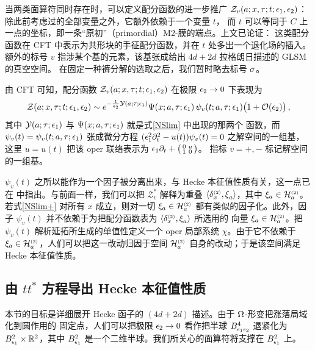 当两类面算符同时存在时，可以定义配分函数的进一步推广
$\mathcal{Z}_v(a;x,\tau;t;\epsilon_1,\epsilon_2)$：除此前考虑过的全部变量之外，它额外依赖于一个变量 $t$，
而 $t$ 可以等同于 $C$ 上一点的坐标，即一条“原初”（primordial）M2-膜的端点。上文已论证：
这类配分函数在 CFT 中表示为共形块的手征配分函数，并在 $t$ 处多出一个退化场的插入。
额外的标号 $v$ 指涉某个基的元素，该基张成给出 $4d+2d$ 拉格朗日描述的 GLSM 的真空空间。
在固定一种裤分解的选取之后，我们暂时略去标号 $\sigma$。

由 CFT \cite{T10,FGT} 可知，配分函数 $\mathcal{Z}_v(a;x,\tau;t;\epsilon_1,\epsilon_2)$ 在极限 $\epsilon_2\to 0$ 下表现为
\begin{equation}\label{NSlim+}
\mathcal{Z}(a;x,\tau;t;\epsilon_1,\epsilon_2)\sim
e^{-\frac{1}{\epsilon_2}\mathcal{Y}(a;\tau;\epsilon_1)}
\Psi(x;a,\tau;\epsilon_1)\,\psi_v(t;a,\tau;\epsilon_1)\big(1+\mathcal{O}(\epsilon_2)\big)\,,
\end{equation}
其中 $\mathcal{Y}(a;\tau;\epsilon_1)$ 与 $\Psi(x;a,\tau;\epsilon_1)$ 就是式\eqref{NSlim} 中出现的那两个
函数，而 $\psi_v(t)=\psi_v(t;a,\tau;\epsilon_1)$ 张成微分方程
$(\epsilon_1^2\partial_t^2-u(t))\psi_v(t)=0$ 之解空间的一组基，这里 $u=u(t)$ 把该 oper 联络表示为
$\epsilon_1\partial_t+\big(\begin{smallmatrix} 0& u \\ 1 & 0\end{smallmatrix}\big)$。
指标 $v=+,-$ 标记解空间的一组基。

$\psi_v(t)$ 之所以能作为一个因子被分离出来，与 Hecke 本征值性质有关，这一点已在
\cite{T10} 中指出。与前面一样，我们可以把 $\mathcal{Z}_v^*$ 解释为重叠
$\langle \delta_x^{\scriptscriptstyle (2)},\xi_a^{}\rangle$，其中 $\xi_a\in\mathcal{H}^{\scriptscriptstyle (2)}_a$。若式\eqref{NSlim+}
对所有 $x$ 成立，则对一切 $\xi_a\in\mathcal{H}^{\scriptscriptstyle (2)}_a$ 都有类似的因子化。此外，因子
$\psi_v(t)$ 并不依赖于为把配分函数表为 $\langle \delta_x^{\scriptscriptstyle (2)},\xi_a^{}\rangle$ 所选用的
向量 $\xi_a\in\mathcal{H}^{\scriptscriptstyle (2)}_a$。把 $\psi_v(t)$ 解析延拓所生成的单值性定义一个 oper
局部系统 $\chi$。由于它不依赖于 $\xi_a\in\mathcal{H}^{\scriptscriptstyle (2)}_a$，人们可以把这一改动归因于空间
$\mathcal{H}^{\scriptscriptstyle (2)}_a$ 自身的改动；于是该空间满足 Hecke 本征值性质。

\subsection{由 $tt^*$ 方程导出 Hecke 本征值性质}\label{Hecke-4d}

本节的目标是详细展开 Hecke 函子的 $(4d+2d)$ 描述。由于 $\Omega$-形变把涨落局域化到圆作用的
固定点，人们可以把极限 $\epsilon_2\to 0$ 看作把半球 $B^4_{\epsilon_1\epsilon_2}$ 退紧化为
$B^2_{\epsilon_1}\times\mathbb{R}^2$，其中 $B^2_{\epsilon_1}$ 是一个二维半球。我们所关心的面算符将支撑在
$B^2_{\epsilon_1}$ 上。

